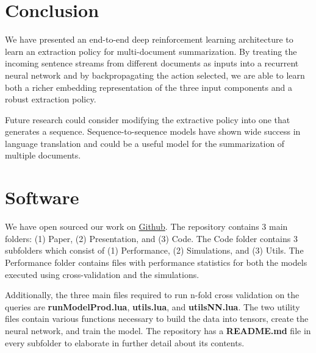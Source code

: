 \documentclass[12pt]{article}
\begin{document}
\section{Conclusion}
We have presented an end-to-end deep reinforcement learning architecture to learn an extraction policy for multi-document summarization. By treating the incoming sentence streams from different documents as inputs into a recurrent neural network and by backpropagating the action selected, we are able to learn both a richer embedding representation of the three input components and a robust extraction policy. 

Future research could consider modifying the extractive policy into one that generates a sequence. Sequence-to-sequence models \cite{sutskever2014sequence} have shown wide success in language translation and could be a useful model for the summarization of multiple documents.

\section{Software}

We have open sourced our work on \href{https://github.com/franciscojavierarceo/DQN-Event-Summarization}{Github}. The repository contains 3 main folders: (1) Paper, (2) Presentation, and (3) Code. The Code folder contains 3 subfolders which consist of (1) Performance, (2) Simulations, and (3) Utils. The Performance folder contains files with performance statistics for both the models executed using cross-validation and the simulations. 

Additionally, the three main files required to run n-fold cross validation on the queries are \textbf{runModelProd.lua}, \textbf{utils.lua}, and \textbf{utilsNN.lua}. The two utility files contain various functions necessary to build the data into tensors, create the neural network, and train the model. The repository has a \textbf{README.md} file in every subfolder to elaborate in further detail about its contents.


\end{document}
